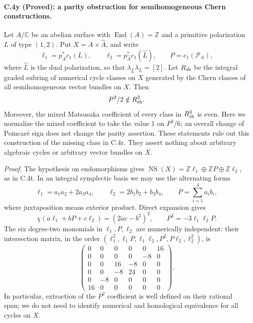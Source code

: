 \paragraph{C.4y (Proved): a parity obstruction for semihomogeneous Chern constructions.}
Let $A/\mathbb C$ be an abelian surface with
$\operatorname{End}(A)=\mathbb Z$ and a primitive polarization $L$ of type
$(1,2)$. Put $X=A\times\widehat A$, and write
\[
 \ell_1=p_A^*c_1(L),\qquad
 \ell_2=p_{\widehat A}^*c_1(\widehat L),\qquad
 P=c_1(\mathcal P_A),
\]
where $\widehat L$ is the dual polarization, so that
$\lambda_{\widehat L}\lambda_L=[2]$. Let $R_{\rm sh}$ be the integral
graded subring of numerical cycle classes on $X$ generated by the Chern
classes of all semihomogeneous vector bundles on $X$. Then
\[
                    P^2/2\notin R_{\rm sh}^{2}.
\]
Moreover, the mixed Matsusaka coefficient of every class in
$R_{\rm sh}^{3}$ is even. Here we normalize the mixed coefficient to
take the value $1$ on $P^3/6$; an overall change of Poincar\'e sign does not
change the parity assertion. These statements rule out this construction
of the missing class in C.4r. They assert nothing about arbitrary algebraic
cycles or arbitrary vector bundles on $X$.

\emph{Proof.}
The hypothesis on endomorphisms gives
$\operatorname{NS}(X)=\mathbb Z\ell_1\oplus\mathbb ZP\oplus
\mathbb Z\ell_2$, as in C.4t. In an integral symplectic basis we may use
the alternating forms
\[
 \ell_1=a_1a_2+2a_3a_4,\qquad
 \ell_2=2b_1b_2+b_3b_4,\qquad
 P=\sum_{i=1}^4a_ib_i,
\]
where juxtaposition means exterior product. Direct expansion gives
\begin{equation}\label{eq:c4-sh-forms}
 \chi(a\ell_1+bP+c\ell_2)=(2ac-b^2)^2,
 \qquad P^3=-3\ell_1\ell_2P.
\end{equation}
The six degree-two monomials in $\ell_1,P,\ell_2$ are numerically
independent: their intersection matrix, in the order
$(\ell_1^2,\ell_1P,\ell_1\ell_2,P^2,P\ell_2,\ell_2^2)$, is
\[
 \begin{pmatrix}
 0&0&0&0&0&16\\
 0&0&0&0&-8&0\\
 0&0&16&-8&0&0\\
 0&0&-8&24&0&0\\
 0&-8&0&0&0&0\\
 16&0&0&0&0&0
 \end{pmatrix}.
\]
In particular, extraction of the $P^2$ coefficient is well defined on
their rational span; we do not need to identify numerical and
homological equivalence for all cycles on $X$.

